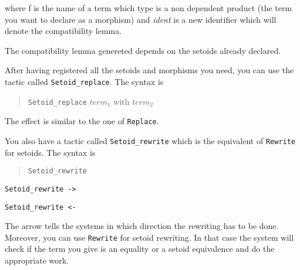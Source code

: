 \noindent where f is the name of a term which type is a non dependent
product (the term you want to declare as a morphism) and
\textit{ident} is a new identifier which will denote the
compatibility lemma.

\begin{ErrMsgs}
\item {}
\item {}
\item {}
\end{ErrMsgs}

The compatibility lemma genereted depends on the setoids already
declared.


After having registered all the setoids and morphisms you need, you can
use the tactic called \texttt{Setoid\_replace}. The syntax is

\begin{quotation}
\texttt{Setoid\_replace} $ term_1$ with $term_2$
\end{quotation}

The effect is similar to the one of \texttt{Replace}.

You also have a tactic called \texttt{Setoid\_rewrite} which is the
equivalent of \texttt{Rewrite} for setoids. The syntax is 

\begin{quotation}
\texttt{Setoid\_rewrite} \term
\end{quotation}

\begin{Variants}
 \item \texttt{Setoid\_rewrite ->} \term
 \item \texttt{Setoid\_rewrite <-} \term
\end{Variants}

The arrow tells the systems in which direction the rewriting has to be
done. Moreover, you can use \texttt{Rewrite} for setoid
rewriting. In that case the system will check if the term you give is
an equality or a setoid equivalence and do the appropriate work.
